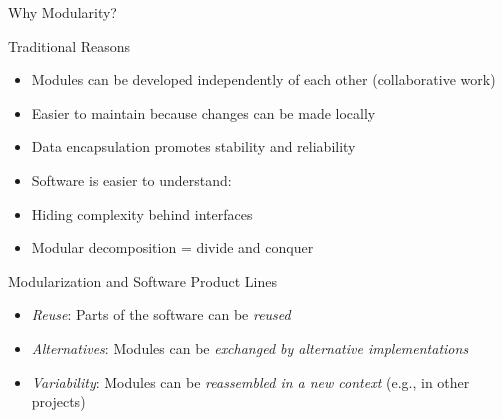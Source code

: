\begin{frame}{Why Modularity?}
	\begin{mycolumns}[widths={45,55},animation=none]
		\begin{note}{Traditional Reasons}
			\begin{itemize}
				\item Modules can be developed independently of each other (collaborative work)
				\item Easier to maintain because changes can be made locally
				\item Data encapsulation promotes stability and reliability
				\item Software is easier to understand:
				\item Hiding complexity behind interfaces
				\item Modular decomposition = divide and conquer
			\end{itemize}						
		\end{note}
		\pause
	\mynextcolumn
		\begin{note}{Modularization and Software Product Lines}
			\begin{itemize}
				\item \emph{Reuse}: Parts of the software can be {\em reused} 
				\item \emph{Alternatives}: Modules can be {\em exchanged by alternative implementations}
				\item \emph{Variability}: Modules can be {\em reassembled in a new context} (e.g., in other projects)
			\end{itemize}
		\end{note}
		\begin{exampletight}{}
		\end{exampletight}
	\end{mycolumns}	
\end{frame}

